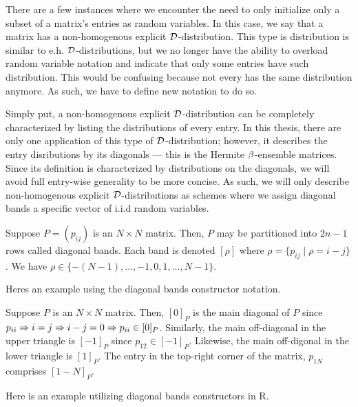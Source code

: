 
There are a few instances where we encounter the need to only initialize only a subset of a matrix's entries as random variables. In this case, we say that a matrix has a non-homogenous explicit $\mathcal{D}$-distribution.
This type is distribution is similar to e.h. $\mathcal{D}$-distributions, but we no longer have the ability to overload random variable notation and indicate that only some entries have such distribution. This would be
confusing because not every has the same distribution anymore. As such, we have to define new notation to do so.

Simply put, a non-homogenous explicit $\mathcal{D}$-distribution can be completely characterized by listing the distributions of every entry.
In this thesis, there are only one application of this type of $\mathcal{D}$-distribution; however, it describes the entry disributions by its diagonals --- this is the Hermite $\beta$-ensemble matrices.
Since its definition is characterized by distributions on the diagonals, we will avoid full entry-wise generality to be more concise.
As such, we will only describe non-homogenous explicit $\mathcal{D}$-distributions as schemes where we assign diagonal bands a specific vector of i.i.d random variables.

\begin{definition}
Suppose $P = (p_{ij})$ is an $N \times N$ matrix. Then, $P$ may be partitioned into $2n - 1$ rows called diagonal bands. Each band is denoted $[\rho]$ where $\rho = \{p_{ij} \mid \rho = i - j\}$. We have
$\rho \in \{ -(N-1), \dots, -1, 0, 1, \dots, N-1 \}$.
\end{definition}

Heres an example using the diagonal bands constructor notation.

\begin{example}
Suppose $P$ is an $N \times N$ matrix. Then, $[0]_P$ is the main diagonal of $P$ since $p_{ii} \Rightarrow i = j \Rightarrow i - j = 0 \Rightarrow p_{ii} \in [0]_P$.
Similarly, the main off-diagonal in the upper triangle is $[-1]_P$ since $p_{12} \in [-1]_P$.
Likewise, the main off-digonal in the lower triangle is $[1]_P$. The entry in the top-right corner of the matrix, $p_{1N}$ comprises $[1 - N]_P$.
\end{example}

\begin{code}
Here is an example utilizing diagonal bands constructors in R.
\end{code}

